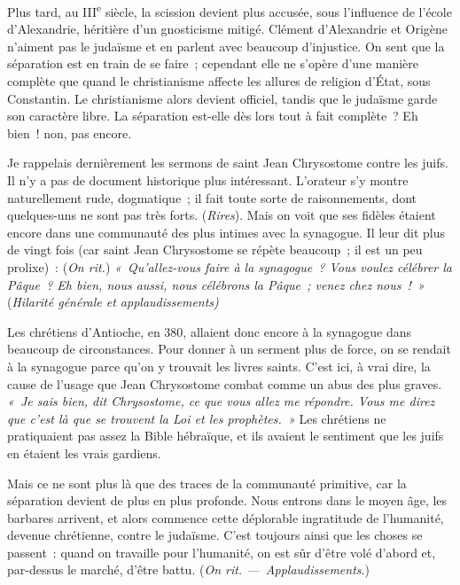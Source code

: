 \documentclass[french,twoside]{book} %
\newcommand\orgName[1]{#1}
\newcommand\persName[1]{#1}
\newcommand\placeName[1]{#1}
\begin{document}
Plus tard, au III\textsuperscript{e} siècle, la scission devient plus accusée, sous l’influence de l’{\orgName école d’Alexandrie}, héritière d’un gnosticisme mitigé. {\persName Clément d’Alexandrie} et {\persName Origène} n’aiment pas le judaïsme et en parlent avec beaucoup d’injustice. On sent que la séparation est en train de se faire ; cependant elle ne s’opère d’une manière complète que quand le christianisme affecte les allures de religion d’État, sous {\persName Constantin}. Le christianisme alors devient officiel, tandis que le judaïsme garde son caractère libre. La séparation est-elle dès lors tout à fait complète ? Eh bien ! non, pas encore.\par
Je rappelais dernièrement les sermons de {\persName saint Jean Chrysostome} contre les juifs. Il n’y a pas de document historique plus intéressant. L’orateur s’y montre naturellement rude, dogmatique ; il fait toute sorte de raisonnements, dont quelques-uns ne sont pas très forts. ({\itshape Rires}). Mais on voit que ses fidèles étaient encore dans une communauté des plus intimes avec la synagogue. Il leur dit plus de vingt fois (car {\persName saint Jean Chrysostome} se répète beaucoup ; il est un peu prolixe) : ({\itshape On rit.}) \emph{« Qu’allez-vous faire à la synagogue ? Vous voulez célébrer la Pâque ? Eh bien, nous aussi, nous célébrons la Pâque ; venez chez nous ! »} ({\itshape Hilarité générale et applaudissements)}\par
Les {\orgName chrétiens} d’{\placeName Antioche}, en 380, allaient donc encore à la synagogue dans beaucoup de circonstances. Pour donner à un serment plus de force, on se rendait à la synagogue parce qu’on y trouvait les livres saints. C’est ici, à vrai dire, la cause de l’usage que {\persName Jean Chrysostome} combat comme un abus des plus graves. \emph{« Je sais bien, dit {\persName Chrysostome}, ce que vous allez me répondre. Vous me direz que c’est là que se trouvent la {\orgName Loi} et les {\orgName prophètes}. »} Les {\orgName chrétiens} ne pratiquaient pas assez la Bible hébraïque, et ils avaient le sentiment que les {\orgName juifs} en étaient les vrais gardiens.\par
Mais ce ne sont plus là que des traces de la communauté primitive, car la séparation devient de plus en plus profonde. Nous entrons dans le moyen âge, les barbares arrivent, et alors commence cette déplorable ingratitude de l’humanité, devenue chrétienne, contre le judaïsme. C’est toujours ainsi que les choses se passent : quand on travaille pour l’humanité, on est sûr d’être volé d’abord et, par-dessus le marché, d’être battu. ({\itshape On rit. — Applaudissements}.)\par
\end{document}
